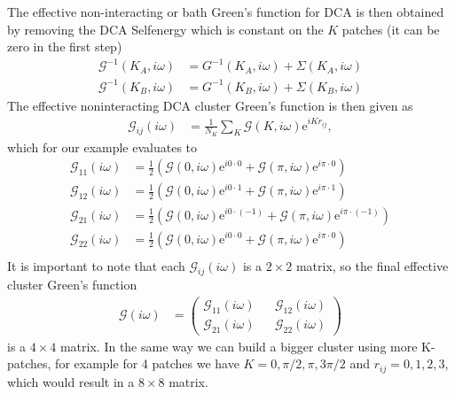 \documentclass[12pt,a4paper]{scrartcl}
\numberwithin{equation}{section}
\begin{document}
The effective non-interacting or bath Green's function for DCA is then obtained by
removing the DCA Selfenergy which is constant on the $K$ patches (it can be zero in the first step)
\begin{align}
 \mathscr{G}^{-1}(K_A,i\omega) &= G^{-1}(K_A,i\omega) + \Sigma(K_A,i\omega) \\
 \mathscr{G}^{-1}(K_B,i\omega) &= G^{-1}(K_B,i\omega) + \Sigma(K_B,i\omega)
\end{align}
The effective noninteracting DCA cluster Green's function is then given as 
\begin{align}
 \mathscr{G}_{ij}(i\omega) &= \frac{1}{N_K} \sum_K \mathscr{G}(K,i\omega) \mathrm{e}^{iKr_{ij}},
\end{align}
which for our example evaluates to
\begin{align}
 \mathscr{G}_{11}(i\omega) 
 &= \frac{1}{2}\left( \mathscr{G}(0,i\omega) \mathrm{e}^{i0\cdot 0} + \mathscr{G}(\pi,i\omega) \mathrm{e}^{i\pi\cdot 0}\right) \\
  \mathscr{G}_{12}(i\omega) 
 &= \frac{1}{2}\left( \mathscr{G}(0,i\omega) \mathrm{e}^{i0\cdot 1} + \mathscr{G}(\pi,i\omega) \mathrm{e}^{i\pi\cdot 1}\right) \\
  \mathscr{G}_{21}(i\omega) 
 &= \frac{1}{2}\left( \mathscr{G}(0,i\omega) \mathrm{e}^{i0\cdot (-1)} + \mathscr{G}(\pi,i\omega) \mathrm{e}^{i\pi\cdot (-1)}\right) \\
  \mathscr{G}_{22}(i\omega) 
 &= \frac{1}{2}\left( \mathscr{G}(0,i\omega) \mathrm{e}^{i0\cdot 0} + \mathscr{G}(\pi,i\omega) \mathrm{e}^{i\pi\cdot 0}\right) \\
\end{align}
It is important to note that each $\mathscr{G}_{ij}(i\omega) $ is a $2\times 2$ matrix, so the final effective
cluster Green's function
\begin{align}
 \mathscr{G}(i\omega)&=
 \begin{pmatrix}
  \mathscr{G}_{11}(i\omega) && \mathscr{G}_{12}(i\omega) \\
  \mathscr{G}_{21}(i\omega) && \mathscr{G}_{22}(i\omega)
 \end{pmatrix}
\end{align}
is a $4\times 4$ matrix. In the same way we can build a bigger cluster using more K-patches, for example for
4 patches we have $K=0,\pi/2, \pi, 3\pi/2$ and $r_{ij}=0,1,2,3$, which would result in 
a $8\times 8$ matrix.
\end{document}
